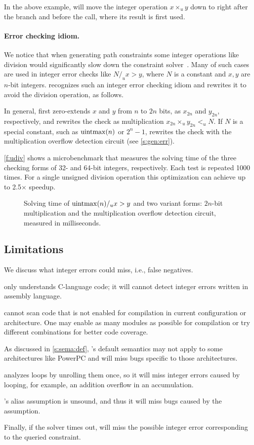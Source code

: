 In the above example, \sys will move the integer operation $x
\times_u y$ down to right after the  branch and before the
 call, where its result  is first used.

\paragraph{Error checking idiom.}

We notice that when generating path constraints some integer
operations like division would significantly slow down the constraint
solver~\cite{brummayer:perf}.  Many of such cases are used in integer
error checks like $N /_u x > y$, where $N$ is a constant and $x,
y$ are $n$-bit integers.  \sys recognizes such an integer error
checking idiom and rewrites it to avoid the division operation, as
follows.

In general, \sys first zero-extends $x$ and $y$ from $n$ to $2n$
bits, as $x_{2n}$ and $y_{2n}$, respectively, and rewrites the check
as multiplication $x_{2n} \times_u y_{2n} <_u N$.  If $N$ is a
special constant, such as $\operatorname{uintmax}(n)$ or $2^n-1$, \sys rewrites
the check with the multiplication overflow detection circuit (see
\autoref{s:gen:err}).

\autoref{f:udiv} shows a microbenchmark that measures the solving
time of the three checking forms of 32- and 64-bit integers,
respectively.  Each test is repeated 1000 times.  For a single
unsigned division operation this optimization can achieve up to
2.5$\times$ speedup.

\begin{figure}
\centering

\caption{Solving time of $\operatorname{uintmax}(n) /_u x > y$ and two variant
forms: $2n$-bit multiplication and the multiplication overflow
detection circuit, measured in milliseconds.}
\label{f:udiv}
\end{figure}

\subsection{Limitations}

We discuss what integer errors \sys could miss, i.e., false negatives.

\sys only understands C-language code; it will cannot detect integer
errors written in assembly language.

\sys cannot scan code that is not enabled for compilation in current
configuration or architecture.  One may enable as many modules as
possible for compilation or try different combinations for better
code coverage.

As discussed in \autoref{s:sema:def}, \sys's default semantics may
not apply to some architectures like PowerPC and will miss bugs
specific to those architectures.

\sys analyzes loops by unrolling them once, so it will miss integer
errors caused by looping, for example, an addition overflow in an
accumulation.

\sys's alias assumption is unsound, and thus it will miss bugs
caused by the assumption.

Finally, if the solver times out, \sys will miss the possible integer
error corresponding to the queried constraint.
